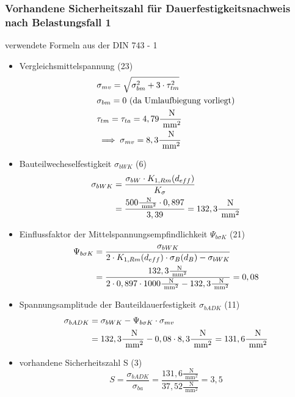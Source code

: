\subsubsection{Vorhandene Sicherheitszahl für Dauerfestigkeitsnachweis nach Belastungsfall 1 }
verwendete Formeln aus der DIN 743 - 1
\begin{itemize}
	\item Vergleichsmittelspannung \hfill (23)
	\begin{align*}
		&\sigma_{mv}= \sqrt{\sigma_{bm}^2+ 3 \cdot \tau_{tm}^2 }  \\
		&\sigma_{bm}= 0 \text{ (da Umlaufbiegung vorliegt)} \\
		&\tau_{tm} = \tau_{ta} = 4,79 \frac{\text{ N}}{\text{ mm}^2} \\
		&\implies \sigma_{mv} = 8,3 \frac{\text{ N}}{\text{ mm}^2} 
	\end{align*}
	\item Bauteilwecheselfestigkeit $\sigma_{bWK}$ \hfill (6)
	\begin{align*}
		\sigma_{bWK}&= \frac{\sigma_{bW} \cdot K_{1,Rm} (d_{eff})}{K_{\sigma}}  \\
		&=  \frac{500 \frac{\text{ N}}{\text{ mm}^2}\cdot 0,897}{3,39} = 132,3 \frac{\text{ N}}{\text{ mm}^2}
	\end{align*}
	\item Einflussfaktor der Mittelspannungsempfindlichkeit $\Psi_{b \sigma K}$ \hfill (21)
	\begin{align*}
		\Psi_{b \sigma K}&= \frac{\sigma_{bWK}}{2 \cdot  K_{1,Rm} (d_{eff}) \cdot \sigma_B (d_B) -\sigma_{bWK}}  \\
		&=  \frac{132,3 \frac{\text{ N}}{\text{ mm}^2}}{2 \cdot 0,897 \cdot 1000\frac{\text{ N}}{\text{ mm}^2} - 132,3 \frac{\text{ N}}{\text{ mm}^2}} = 0,08 
	\end{align*}
	\item Spannungsamplitude der Bauteildauerfestigkeit $\sigma_{bADK}$ \hfill (11) 
	\begin{align*}
		\sigma_{bADK} &= \sigma_{bWK} - \Psi_{b \sigma K} \cdot \sigma_{mv} \\
		&= 132,3 \frac{\text{ N}}{\text{ mm}^2} - 0,08 \cdot 8,3 \frac{\text{ N}}{\text{ mm}^2} = 131,6 \frac{\text{ N}}{\text{ mm}^2} 
	\end{align*}
	\item vorhandene Sicherheitszahl S \hfill (3)
	\[
		S= \frac{\sigma_{bADK}}{\sigma_{ba}} = \frac{131,6 \frac{\text{ N}}{\text{ mm}^2}}{37,52 \frac{\text{ N}}{\text{ mm}^2} } = 3,5
	\]
\end{itemize}
